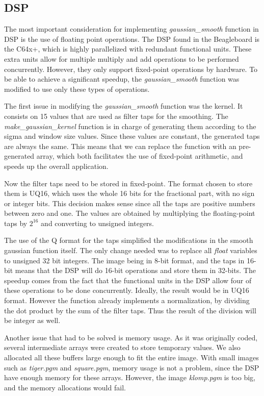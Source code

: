 \subsection{DSP}
The most important consideration for implementing \textit{gaussian\_smooth} function in DSP is the use of floating point operations. The DSP found in the Beagleboard is the C64x+, which is highly parallelized with redundant functional units. These extra units allow for multiple multiply and add operations to be performed concurrently. However, they only support fixed-point operations by hardware. To be able to achieve a significant speedup, the \textit{gaussian\_smooth} function was modified to use only these types of operations.

The first issue in modifying the \textit{gaussian\_smooth} function was the kernel. It consists on 15 values that are used as filter taps for the smoothing. The \textit{make\_gaussian\_kernel} function is in charge of generating them according to the sigma and window size values. Since these values are constant, the generated taps are always the same. This means that we can replace the function with an pre-generated array, which both facilitates the use of fixed-point arithmetic, and speeds up the overall application.

Now the filter taps need to be stored in fixed-point. The format chosen to store them is UQ16, which uses the whole 16 bits for the fractional part, with no sign or integer bits. This decision makes sense since all the taps are positive numbers between zero and one. The values are obtained by multiplying the floating-point taps by $2^{16}$ and converting to unsigned integers.

The use of the Q format for the taps simplified the modifications in the smooth gaussian function itself. The only change needed was to replace all \textit{float} variables to unsigned 32 bit integers. The image being in 8-bit format, and the taps in 16-bit means that the DSP will do 16-bit operations and store them in 32-bits.  The speedup comes from the fact that the functional units in the DSP allow four of these operations to be done concurrently. Ideally, the result would be in UQ16 format. However the function already implements a normalization, by dividing the dot product by the sum of the filter taps. Thus the result of the division will be integer as well.

Another issue that had to be solved is memory usage. As it was originally coded, several intermediate arrays were created to store temporary values. We also allocated all these buffers large enough to fit the entire image. With small images such as \textit{tiger.pgm} and \textit{square.pgm}, memory usage is not a problem, since the DSP have enough memory for these arrays. However, the image \textit{klomp.pgm} is too big, and the memory allocations would fail.

